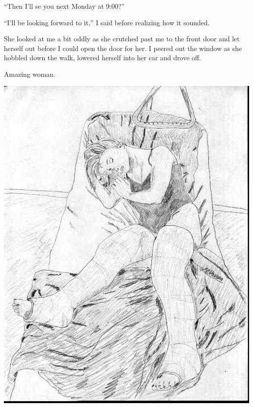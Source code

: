``Then I'll se you next Monday at 9:00?''

``I'll be looking forward to it,'' I said before realizing how it sounded.

She looked at me a bit oddly as she crutched past me to the front door and let herself out
before I could open the door for her. I peered out the window as she hobbled down the walk,
lowered herself into her car and drove off.

Amazing woman.

\begin{center}
\includegraphics{images/kicks18.jpg}
\end{center}
